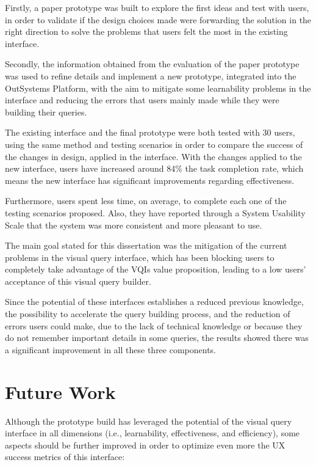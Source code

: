 Firstly, a paper prototype was built to explore the first ideas and test with users, in order to validate if the design choices made were forwarding the solution in the right direction to solve the problems that users felt the most in the existing interface.

Secondly, the information obtained from the evaluation of the paper prototype was used to refine details and implement a new prototype, integrated into the OutSystems Platform, with the aim to mitigate some learnability problems in the interface and reducing the errors that users mainly made while they were building their queries.

The existing interface and the final prototype were both tested with 30 users, using the same method and testing scenarios in order to compare the success of the changes in design, applied in the interface. With the changes applied to the new interface, users have increased around 84\% the task completion rate, which means the new interface has significant improvements regarding effectiveness.

Furthermore, users spent less time, on average, to complete each one of the testing scenarios proposed. Also, they have reported through a System Usability Scale \cite{system_usability_scale} that the system was more consistent and more pleasant to use.

The main goal stated for this dissertation was the mitigation of the current problems in the visual query interface, which has been blocking users to completely take advantage of the \glspl{VQI} value proposition, leading to a low users' acceptance of this visual query builder.

Since the potential of these interfaces establishes a reduced previous knowledge, the possibility to accelerate the query building process, and the reduction of errors users could make, due to the lack of technical knowledge or because they do not remember important details in some queries, the results showed there was a significant improvement in all these three components.


\section{Future Work}
\label{sec:future_work}

Although the prototype build has leveraged the potential of the visual query interface in all dimensions (i.e., learnability, effectiveness, and efficiency), some aspects should be further improved in order to optimize even more the \gls{UX} success metrics of this interface:

